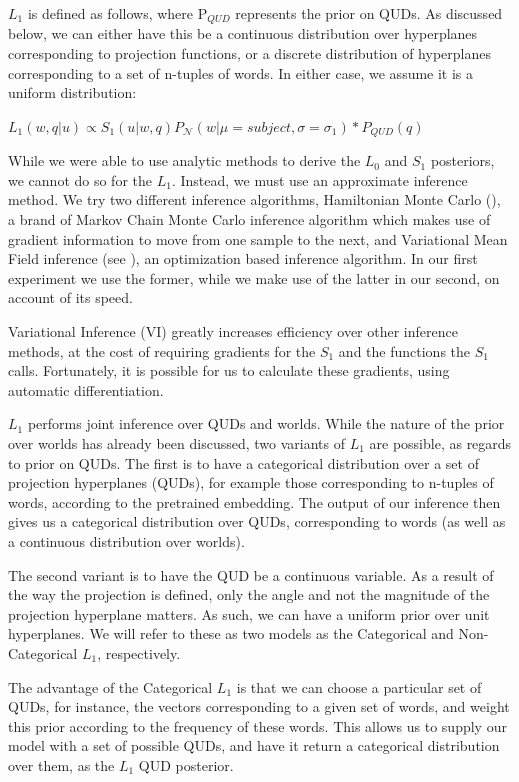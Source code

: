 \documentclass[10pt,letterpaper,twocolumn]{article}
\begin{document}
$L_1$ is defined as follows, where P$_{QUD}$ represents the prior on QUDs. As discussed below, we can either have this be a continuous distribution over hyperplanes corresponding to projection functions, or a discrete distribution of hyperplanes corresponding to a set of n-tuples of words. In either case, we assume it is a uniform distribution:
\begin{exe}
\ex $L_1(w,q\vert u) \propto S_1(u\vert w,q) P_{\mathcal{N}}(w\vert\mu=subject,\sigma=\sigma_1)*P_{QUD}(q)$
\end{exe}
While we were able to use analytic methods to derive the $L_0$ and $S_1$ posteriors, we cannot do so for the $L_1$. Instead, we must use an approximate inference method. We try two different inference algorithms, Hamiltonian Monte Carlo (\cite{neal2011mcmc}), a brand of Markov Chain Monte Carlo inference algorithm which makes use of gradient information to move from one sample to the next, and Variational Mean Field inference (see \cite{blei2017variational}), an optimization based inference algorithm. In our first experiment we use the former, while we make use of the latter in our second, on account of its speed.

Variational Inference (VI) greatly increases efficiency over other inference methods, at the cost of requiring gradients for the $S_1$ and the functions the $S_1$ calls. Fortunately, it is possible for us to calculate these gradients, using automatic differentiation.

$L_1$ performs joint inference over QUDs and worlds. While the nature of the prior over worlds has already been discussed, two variants of $L_1$ are possible, as regards to prior on QUDs. The first is to have a categorical distribution over a set of projection hyperplanes (QUDs), for example those corresponding to n-tuples of words, according to the pretrained embedding. The output of our inference then gives us a categorical distribution over QUDs, corresponding to words (as well as a continuous distribution over worlds). 

The second variant is to have the QUD be a continuous variable. As a result of the way the projection is defined, only the angle and not the magnitude of the projection hyperplane matters. As such, we can have a uniform prior over unit hyperplanes. We will refer to these as two models as the Categorical and Non-Categorical $L_1$, respectively.

The advantage of the Categorical $L_1$ is that we can choose a particular set of QUDs, for instance, the vectors corresponding to a given set of words, and weight this prior according to the frequency of these words. This allows us to supply our model with a set of possible QUDs, and have it return a categorical distribution over them, as the $L_1$ QUD posterior.
\end{document}
